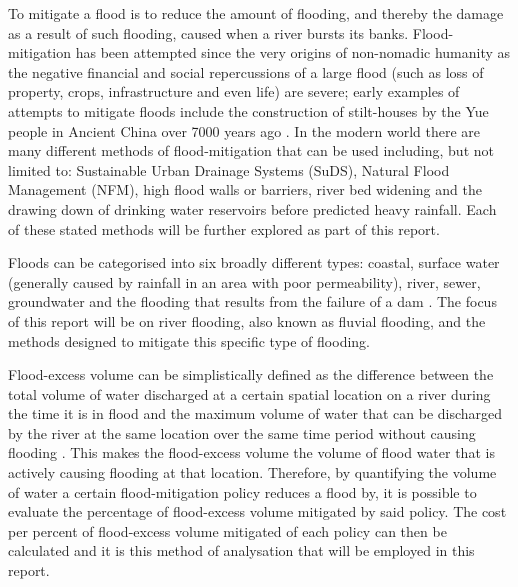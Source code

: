 \documentclass[11pt,a4paper]{article}
\begin{document}
To mitigate a flood is to reduce the amount of flooding, and thereby the damage as a result of such flooding, caused when a river bursts its banks. Flood-mitigation has been attempted since the very origins of non-nomadic humanity as the negative financial and social repercussions of a large flood (such as loss of property, crops, infrastructure and even life) are severe{;} early examples of attempts to mitigate floods include the construction of stilt-houses by the Yue people in Ancient China over 7000 years ago \cite{yue}. In the modern world there are many different methods of flood-mitigation that can be used including, but not limited to: Sustainable Urban Drainage Systems (SuDS), Natural Flood Management (NFM), high flood walls or barriers, river bed widening and the drawing down of drinking water reservoirs before predicted heavy rainfall. Each of these stated methods will be further explored as part of this report.

Floods can be categorised into six broadly different types: coastal, surface water (generally caused by rainfall in an area with poor permeability), river, sewer, groundwater and the flooding that results from the failure of a dam \cite{floodsource}. The focus of this report will be on river flooding, also known as fluvial flooding, and the methods designed to mitigate this specific type of flooding.

Flood-excess volume can be simplistically defined as the difference between the total volume of water discharged at a certain spatial location on a river during the time it is in flood and the maximum volume of water that can be discharged by the river at the same location over the same time period without causing flooding \cite{Aire}. This makes the flood-excess volume the volume of flood water that is actively causing flooding at that location. Therefore, by quantifying the volume of water a certain flood-mitigation policy reduces a flood by, it is possible to evaluate the percentage of flood-excess volume mitigated by said policy. The cost per percent of flood-excess volume mitigated of each policy can then be calculated and it is this method of analysation that will be employed in this report.
\end{document}
